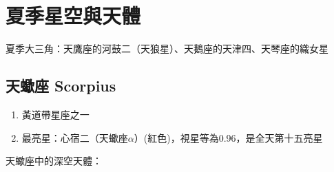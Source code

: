 \section{夏季星空與天體}
夏季大三角：天鷹座的河鼓二（天狼星）、天鵝座的天津四、天琴座的織女星

\subsection{天蠍座 Scorpius}
\begin{enumerate}
    \item 黃道帶星座之一
    \item 最亮星：心宿二（天蠍座\(\alpha\)）(紅色)，視星等為0.96，是全天第十五亮星
\end{enumerate}
天蠍座中的深空天體：
\newline


